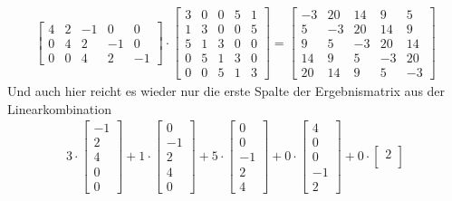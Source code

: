 \begin{ExCalc}
\begin{align}
\begin{bmatrix}
 4  &   2  &  -1  &   0  &   0\\
 0  &   4  &   2  &  -1  &   0\\
 0  &   0  &   4  &   2  &  -1
\end{bmatrix}
\cdot
\begin{bmatrix}
3  &   0  &   0  &   5  &   1\\
1  &   3  &   0  &   0  &   5\\
5  &   1  &   3  &   0  &   0\\
0  &   5  &   1  &   3  &   0\\
0  &   0  &   5  &   1  &   3
\end{bmatrix}
=
\begin{bmatrix}
-3  &  20  &  14  &   9  &  5\\
 5  &  -3  &  20  &  14  &  9\\
 9  &   5  &  -3  &  20  &  14\\
14  &   9  &   5  &  -3  &  20\\
20  &  14  &   9  &   5  &  -3
\end{bmatrix}
\end{align}
Und auch hier reicht es wieder nur die erste Spalte der Ergebnismatrix aus der
Linearkombination
\begin{align}
3 \cdot
\begin{bmatrix}
-1\\
 2\\
 4\\
 0\\
 0
\end{bmatrix}
+ 1 \cdot
\begin{bmatrix}
0\\
-1\\
2\\
4\\
0
\end{bmatrix}
+ 5 \cdot
\begin{bmatrix}
0\\
0\\
-1\\
2\\
4
\end{bmatrix}
+ 0 \cdot
\begin{bmatrix}
4\\
0\\
0\\
-1\\
2
\end{bmatrix}
+ 0 \cdot
\begin{bmatrix}
2\\

\end{bmatrix}
\end{align}
\end{ExCalc}

